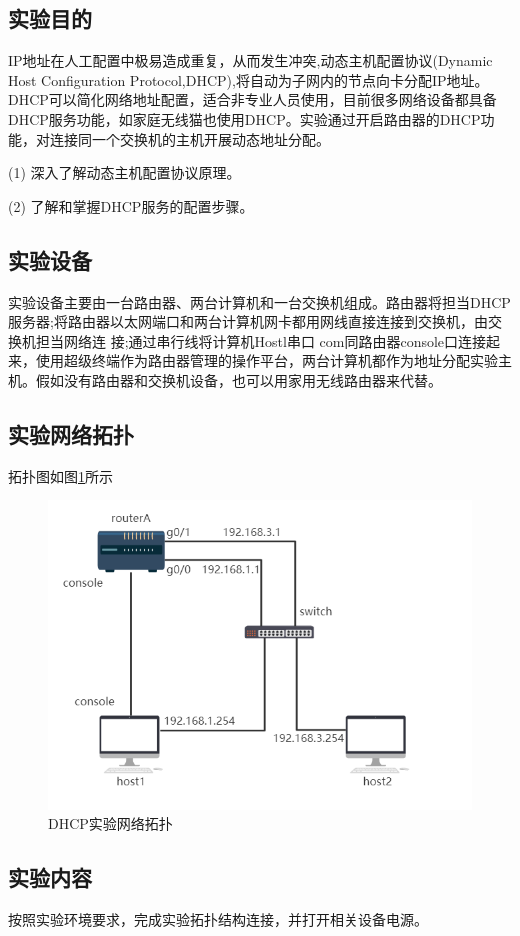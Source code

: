 \documentclass[lang=cn,11pt,a4paper,cite=authoryear]{elegantpaper}
\begin{document}
\subsection{实验目的}

IP地址在人工配置中极易造成重复，从而发生冲突,动态主机配置协议(Dynamic Host Configuration Protocol,DHCP),将自动为子网内的节点向卡分配IP地址。DHCP可以简化网络地址配置，适合非专业人员使用，目前很多网络设备都具备DHCP服务功能，如家庭无线猫也使用DHCP。实验通过开启路由器的DHCP功能，对连接同一个交换机的主机开展动态地址分配。

(1)	深入了解动态主机配置协议原理。

(2)	了解和掌握DHCP服务的配置步骤。

\subsection{实验设备}

实验设备主要由一台路由器、两台计算机和一台交换机组成。路由器将担当DHCP服务器;将路由器以太网端口和两台计算机网卡都用网线直接连接到交换机，由交换机担当网络连 接;通过串行线将计算机Hostl串口 com同路由器console口连接起来，使用超级终端作为路由器管理的操作平台，两台计算机都作为地址分配实验主机。假如没有路由器和交换机设备，也可以用家用无线路由器来代替。

\subsection{实验网络拓扑}


拓扑图如图\ref{fig:DHCP}所示
\begin{figure}[htbp]
	\centering
	\includegraphics[width=0.7\linewidth]{image/screenshot014}
	\caption{DHCP实验网络拓扑}
	\label{fig:DHCP}
\end{figure}

\subsection{实验内容}
按照实验环境要求，完成实验拓扑结构连接，并打开相关设备电源。
\end{document}
